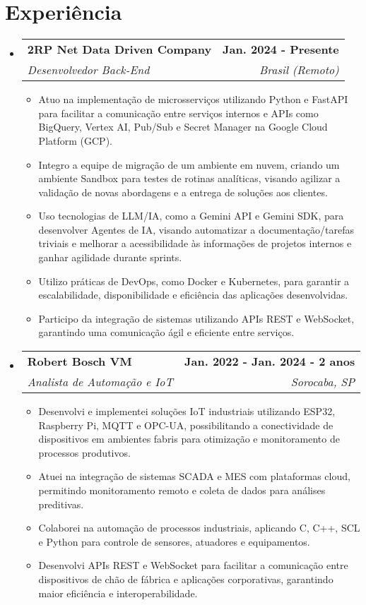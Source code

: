 \documentclass[letterpaper,11pt]{article}
\makeatletter
\newcommand{\resumeItem}[1]{
  \item\small{
    {#1 \vspace{-2pt}}
  }
}
\newcommand{\resumeSubheading}[4]{
  \vspace{-2pt}\item
    \begin{tabular*}{1.0\textwidth}[t]{l@{\extracolsep{\fill}}r}
      \textbf{#1} & \textbf{\small #2} \\
      \textit{\small#3} & \textit{\small #4} \\
    \end{tabular*}\vspace{-7pt}
}
\newcommand{\resumeSubHeadingListStart}{\begin{itemize}[leftmargin=0.0in, label={}]}
\newcommand{\resumeSubHeadingListEnd}{\end{itemize}}
\newcommand{\resumeItemListStart}{\begin{itemize}}
\newcommand{\resumeItemListEnd}{\end{itemize}\vspace{-5pt}}
\makeatother
\begin{document}
\section{Experiência}
  \resumeSubHeadingListStart

    \resumeSubheading
      {2RP Net Data Driven Company}{Jan. 2024 - Presente}
      {Desenvolvedor Back-End}{Brasil (Remoto)}
      \resumeItemListStart
        \resumeItem{Atuo na implementação de microsserviços utilizando Python e FastAPI para facilitar a comunicação entre serviços internos e APIs como BigQuery, Vertex AI, Pub/Sub e Secret Manager na Google Cloud Platform (GCP).}
        \resumeItem{Integro a equipe de migração de um ambiente em nuvem, criando um ambiente Sandbox para testes de rotinas analíticas, visando agilizar a validação de novas abordagens e a entrega de soluções aos clientes.}
        \resumeItem{Uso tecnologias de LLM/IA, como a Gemini API e Gemini SDK, para desenvolver Agentes de IA, visando automatizar a documentação/tarefas triviais e melhorar a acessibilidade às informações de projetos internos e  ganhar agilidade durante sprints.}
        \resumeItem{Utilizo práticas de DevOps, como Docker e Kubernetes, para garantir a escalabilidade, disponibilidade e eficiência das aplicações desenvolvidas.}
        \resumeItem{Participo da integração de sistemas utilizando APIs REST e WebSocket, garantindo uma comunicação ágil e eficiente entre serviços.}
      \resumeItemListEnd

    \resumeSubheading
      {Robert Bosch VM}{Jan. 2022 - Jan. 2024 - 2 anos}
      {Analista de Automação e IoT}{Sorocaba, SP}
      \resumeItemListStart
        \resumeItem{Desenvolvi e implementei soluções IoT industriais utilizando ESP32, Raspberry Pi, MQTT e OPC-UA, possibilitando a conectividade de dispositivos em ambientes fabris para otimização e monitoramento de processos produtivos.}
        \resumeItem{Atuei na integração de sistemas SCADA e MES com plataformas cloud, permitindo monitoramento remoto e coleta de dados para análises preditivas.}
        \resumeItem{Colaborei na automação de processos industriais, aplicando C, C++, SCL e Python para controle de sensores, atuadores e equipamentos.}
        \resumeItem{Desenvolvi APIs REST e WebSocket para facilitar a comunicação entre dispositivos de chão de fábrica e aplicações corporativas, garantindo maior eficiência e interoperabilidade.}
    \resumeItemListEnd
    
  \resumeSubHeadingListEnd
\vspace{-16pt}
\end{document}

